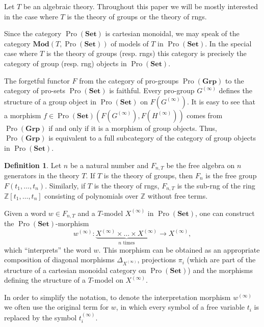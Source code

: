 \documentclass[oneside, 11pt]{amsart}
\numberwithin{equation}{section}
\theoremstyle{definition}
\newtheorem{df}[lemma]{Definition} \Crefname{df}{Definition}{Definitions}
\theoremstyle{remark}
\DeclareMathOperator{\Pro}{Pro}
\newcommand{\Set}{\mathbf{Set}}
\newcommand{\Group}{\mathbf{Grp}}
\newcommand{\Mod}{\mathbf{Mod}}
\begin{document}
Let $T$ be an algebraic theory. Throughout this paper we will be mostly interested in the case where $T$ is the theory of groups or the theory of rngs.

Since the category $\Pro(\Set)$ is cartesian monoidal, we may speak of the category $\Mod(T, \Pro(\Set))$ of models of $T$ in \(\Pro(\Set)\).
In the special case where $T$ is the theory of groups (resp. rngs) this category is precisely the category of group (resp. rng) objects in $\Pro(\Set)$.

The forgetful functor $F$ from the category of pro-groups \(\Pro(\Group)\) to the category of pro-sets \(\Pro(\Set)\) is faithful. Every pro-group $G^{(\infty)}$ defines the structure of a group object in \(\Pro(\Set)\) on $F\left(G^{(\infty)}\right)$. It is easy to see that a morphism \(f \in \Pro(\Set)\left(F\left(G^{(\infty)}\right), F\left(H^{(\infty)}\right)\right)\) comes from \(\Pro(\Group)\) if and only if it is a morphism of group objects. Thus, $\Pro(\Group)$ is equivalent to a full subcategory of the category of group objects in $\Pro(\Set)$.

\begin{df} \label{df-pro-set-morphisms} 
 Let $n$ be a natural number and $F_{n, T}$ be the free algebra on $n$ generators in the theory $T$.
 If $T$ is the theory of groups, then $F_n$ is the free group $F(t_1,\ldots, t_n)$.
 Similarly, if $T$ is the theory of rngs, $F_{n, T}$ is the sub-rng of the ring $\mathbb{Z}[t_1,\ldots, t_n]$ consisting of polynomials over $\mathbb{Z}$ without free terms.
 
 Given a word $w \in F_{n, T}$ and a $T$-model $X^{(\infty)}$ in $\Pro(\Set)$, one can construct the $\Pro(\Set)$-morphism
 \[ w^{(\infty)} \colon \underbrace{X^{(\infty)} \times \ldots \times X^{(\infty)}}_{n\text{ times}} \to X^{(\infty)}, \]
 which ``interprets'' the word $w$. This morphism can be obtained as an appropriate composition of diagonal morphisms $\Delta_{X^{(\infty)}}$, projections $\pi_i$ 
 (which are part of the structure of a cartesian monoidal category on $\Pro(\Set)$) 
 and the morphisms defining the structure of a $T$-model on $X^{(\infty)}$.
 
 In order to simplify the notation, to denote the interpretation morphism $w^{(\infty)}$ we often use the original term for $w$, in which every symbol of a free variable $t_i$ is replaced by the symbol $t_i^{(\infty)}$.
\end{df}
\end{document}
